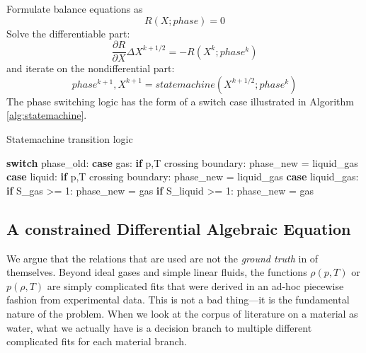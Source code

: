 \documentclass[]{article}
\newenvironment{Shaded}{}{}
\newcommand{\ControlFlowTok}[1]{\textcolor[rgb]{0.00,0.44,0.13}{\textbf{#1}}}
\newcommand{\DecValTok}[1]{\textcolor[rgb]{0.25,0.63,0.44}{#1}}
\newcommand{\NormalTok}[1]{#1}
\begin{document}
Formulate balance equations as
\begin{equation}
R(X ; phase) = 0
\end{equation}
Solve the differentiable part:
\[\frac{\partial R}{\partial X}\Delta X^{k+1/2} = -R(X^k ; phase^k)\]
and iterate on the nondifferential part:
\[phase^{k+1},X^{k+1} = statemachine(X^{k+1/2} ; phase^k)\]
The phase switching logic has the form of a switch case illustrated in
Algorithm \ref{alg:statemachine}.

\begin{algorithm}
  \caption{\label{alg:statemachine}Statemachine transition logic}
\begin{Shaded}
\begin{Highlighting}[]
\ControlFlowTok{switch}\NormalTok{ phase_old:}
  \ControlFlowTok{case}\NormalTok{ gas:}
    \ControlFlowTok{if}\NormalTok{ p,T crossing boundary:}
\NormalTok{      phase_new = liquid_gas}
  \ControlFlowTok{case}\NormalTok{ liquid:}
    \ControlFlowTok{if}\NormalTok{ p,T crossing boundary:}
\NormalTok{      phase_new = liquid_gas}
  \ControlFlowTok{case}\NormalTok{ liquid_gas:}
    \ControlFlowTok{if}\NormalTok{ S_gas >= }\DecValTok{1}\NormalTok{:}
\NormalTok{      phase_new = gas}
    \ControlFlowTok{if}\NormalTok{ S_liquid >= }\DecValTok{1}\NormalTok{:}
\NormalTok{      phase_new = gas}
\end{Highlighting}
\end{Shaded}
\end{algorithm}

\hypertarget{header-n3262}{%
\subsection{A constrained Differential Algebraic
Equation}\label{header-n3262}}

We argue that the relations that are used are not the \emph{ground
truth} in of themselves. Beyond ideal gases and simple linear fluids,
the functions \(\rho(p,T)\) or \(p(\rho,T)\) are simply complicated fits
that were derived in an ad-hoc piecewise fashion from experimental data.
This is not a bad thing---it is the fundamental nature of the problem.
When we look at the corpus of literature on a material as water, what we
actually have is a decision branch to multiple different complicated
fits for each material branch.
\end{document}
